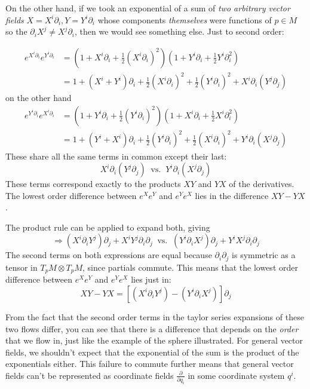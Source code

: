 \documentclass[../master.tex]{subfiles}
\begin{document}
		On the other hand, if we took an exponential of a sum of \emph{two arbitrary vector fields} $X=X^i \partial_i, Y = Y^i \partial_i$ whose components \emph{themselves} were functions of $p \in M$ so the $\partial_i X^j \neq X^j \partial_i$, then we would see something else. Just to second order: 
		
		\begin{align*}
			e^{X^i \partial_i} e^{Y^i \partial_i} &= (1 + X^i \partial_i + \frac{1}{2} {(X^i \partial_i)^2})(1 + Y^i \partial_i + \frac{1}{2} {Y^i \partial_i^2})\\
			& = 1 + (X^i + Y^i) \partial_i + \frac{1}{2} (X^i \partial_i)^2 + \frac{1}{2}(Y^i \partial_i)^2 + X^i \partial_i (Y^j \partial_j)
		\end{align*}
		on the other hand 
		\begin{align*}
			e^{Y^i \partial_i} e^{X^i \partial_i} &= (1 + Y^i \partial_i + \frac{1}{2} {(Y^i \partial_i)^2})(1 + X^i \partial_i + \frac{1}{2} {X^i \partial_i^2})\\
			& = 1 + (Y^i + X^i) \partial_i + \frac{1}{2} (Y^i \partial_i)^2 + \frac{1}{2}(X^i \partial_i)^2 + Y^i \partial_i (X^j \partial_j)
		\end{align*}
		These share all the same terms in common except their last:
		\begin{equation*}
			X^i \partial_i (Y^j \partial_j) ~\text{ vs. }~ Y^i \partial_i (X^j \partial_j)
		\end{equation*}
		These terms correspond exactly to the products $XY$ and $YX$ of the derivatives. The lowest order difference between $e^X e^Y$ and $e^Y e^X$ lies in the difference $XY - YX$. 
		
		The product rule can be applied to expand both, giving
		\begin{equation*}
			\Rightarrow (X^i \partial_i Y^j) \partial_j + X^i Y^j \partial_i \partial_j  ~\text{ vs. }~ (Y^i \partial_i X^j) \partial_j + Y^i X^j \partial_i \partial_j
		\end{equation*}
		The second terms on both expressions are equal because $\partial_i \partial_j$ is symmetric as a tensor in $T_p M \otimes T_p M$, since partials commute. This means that the lowest order difference between $e^X e^Y$ and $e^Y e^X$ lies just in:
		\begin{equation}\label{eq:first_commutator}
			XY - YX = \left[  (X^i \partial_i Y^j) - (Y^i \partial_i X^j) \right] \partial_j 
		\end{equation}
		
		From the fact that the second order terms in the taylor series expansions of these two flows differ, you can see that there is a difference that depends on the \emph{order} that we flow in, just like the example of the sphere illustrated. For general vector fields, we shouldn't expect that the exponential of the sum is the product of the exponentials either. %
		This failure to commute further means that general vector fields can't be represented as coordinate fields  $\frac{\partial}{\partial q_i}$ in some coordinate system $q^i$. 
		
\end{document}
